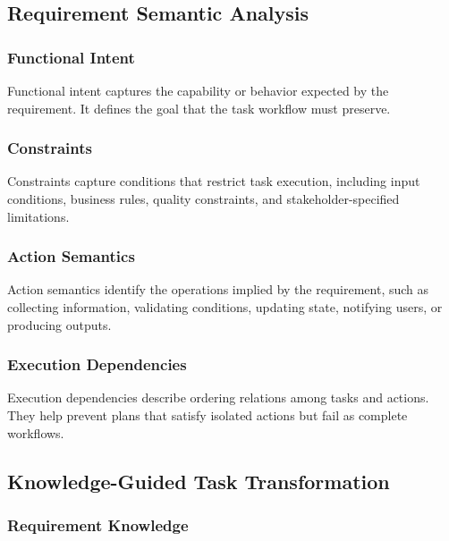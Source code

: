 \subsection{Requirement Semantic Analysis}
\label{sec:method-semantic}

\subsubsection{Functional Intent}
\label{sec:method-intent}

Functional intent captures the capability or behavior expected by the requirement.
It defines the goal that the task workflow must preserve.

\subsubsection{Constraints}
\label{sec:method-constraints}

Constraints capture conditions that restrict task execution, including input conditions, business rules, quality constraints, and stakeholder-specified limitations.

\subsubsection{Action Semantics}
\label{sec:method-action-semantics}

Action semantics identify the operations implied by the requirement, such as collecting information, validating conditions, updating state, notifying users, or producing outputs.

\subsubsection{Execution Dependencies}
\label{sec:method-dependencies}

Execution dependencies describe ordering relations among tasks and actions.
They help prevent plans that satisfy isolated actions but fail as complete workflows.

\subsection{Knowledge-Guided Task Transformation}
\label{sec:method-knowledge}

\subsubsection{Requirement Knowledge}
\label{sec:method-req-knowledge}

